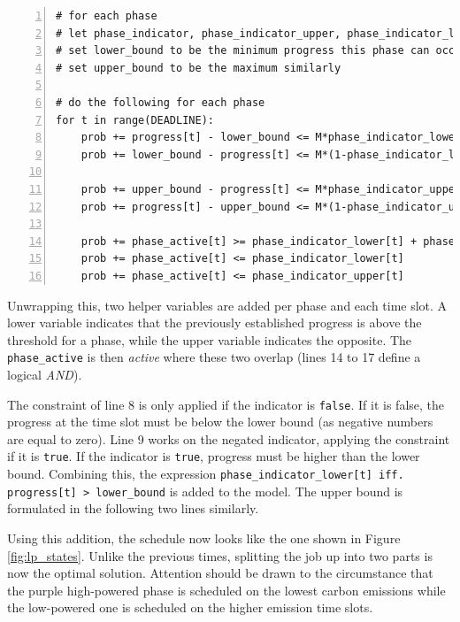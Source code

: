 \begin{minipage}{\linewidth}
\begin{lstlisting}[frame=single, numbers=left, caption={Phase detection in LP}, label={list:lp_phases}, basicstyle=\ttfamily, breaklines]
# for each phase
# let phase_indicator, phase_indicator_upper, phase_indicator_lower be DEADLINE-many boolean variables
# set lower_bound to be the minimum progress this phase can occur in 
# set upper_bound to be the maximum similarly

# do the following for each phase
for t in range(DEADLINE):
    prob += progress[t] - lower_bound <= M*phase_indicator_lower[t]
    prob += lower_bound - progress[t] <= M*(1-phase_indicator_lower[t])

    prob += upper_bound - progress[t] <= M*phase_indicator_upper[t]
    prob += progress[t] - upper_bound <= M*(1-phase_indicator_upper[t])

    prob += phase_active[t] >= phase_indicator_lower[t] + phase_indicator_upper[t] - 1
    prob += phase_active[t] <= phase_indicator_lower[t]
    prob += phase_active[t] <= phase_indicator_upper[t]
\end{lstlisting}
\end{minipage}

Unwrapping this, two helper variables are added per phase and each time slot. 
A lower variable indicates that the previously established progress is above the threshold for a phase, while the upper variable indicates the opposite. 
The \verb|phase_active| is then \emph{active} where these two overlap (lines 14 to 17 define a logical \emph{AND}).

The constraint of line 8 is only applied if the indicator is \verb|false|.
If it is false, the progress at the time slot must be below the lower bound (as negative numbers are equal to zero).
Line 9 works on the negated indicator, applying the constraint if it is \verb|true|. 
If the indicator is \verb|true|, progress must be higher than the lower bound. 
Combining this, the expression \verb|phase_indicator_lower[t] iff. progress[t] > lower_bound| is added to the model. 
The upper bound is formulated in the following two lines similarly.

Using this addition, the schedule now looks like the one shown in Figure \ref{fig:lp_states}. 
Unlike the previous times, splitting the job up into two parts is now the optimal solution. 
Attention should be drawn to the circumstance that the purple high-powered phase is scheduled on the lowest carbon emissions while the low-powered one is scheduled on the higher emission time slots.

